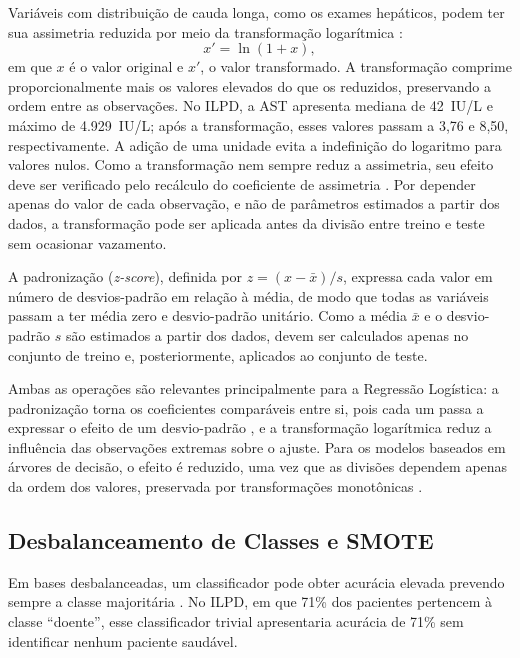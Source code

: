 Variáveis com distribuição de cauda longa, como os exames hepáticos, podem ter sua assimetria reduzida por meio da transformação logarítmica \cite{logtransformation}:
\begin{equation}
    x' = \ln(1 + x),
    \label{eq:log}
\end{equation}
em que $x$ é o valor original e $x'$, o valor transformado. A transformação comprime proporcionalmente mais os valores elevados do que os reduzidos, preservando a ordem entre as observações. No ILPD, a AST apresenta mediana de 42~IU/L e máximo de 4.929~IU/L; após a transformação, esses valores passam a 3,76 e 8,50, respectivamente. A adição de uma unidade evita a indefinição do logaritmo para valores nulos. Como a transformação nem sempre reduz a assimetria, seu efeito deve ser verificado pelo recálculo do coeficiente de assimetria \cite{logtransformation}. Por depender apenas do valor de cada observação, e não de parâmetros estimados a partir dos dados, a transformação pode ser aplicada antes da divisão entre treino e teste sem ocasionar vazamento.

A padronização (\textit{z-score}), definida por $z = (x - \bar{x})/s$, expressa cada valor em número de desvios-padrão em relação à média, de modo que todas as variáveis passam a ter média zero e desvio-padrão unitário. Como a média $\bar{x}$ e o desvio-padrão $s$ são estimados a partir dos dados, devem ser calculados apenas no conjunto de treino e, posteriormente, aplicados ao conjunto de teste.

Ambas as operações são relevantes principalmente para a Regressão Logística: a padronização torna os coeficientes comparáveis entre si, pois cada um passa a expressar o efeito de um desvio-padrão \cite{Hosmer2005Applied}, e a transformação logarítmica reduz a influência das observações extremas sobre o ajuste. Para os modelos baseados em árvores de decisão, o efeito é reduzido, uma vez que as divisões dependem apenas da ordem dos valores, preservada por transformações monotônicas \cite{elementsofstatiscal}.

\subsection{Desbalanceamento de Classes e SMOTE}
\label{sec:fund_smote}

Em bases desbalanceadas, um classificador pode obter acurácia elevada prevendo sempre a classe majoritária \cite{FAWCETT2006861}. No ILPD, em que 71\% dos pacientes pertencem à classe ``doente'', esse classificador trivial apresentaria acurácia de 71\% sem identificar nenhum paciente saudável.

